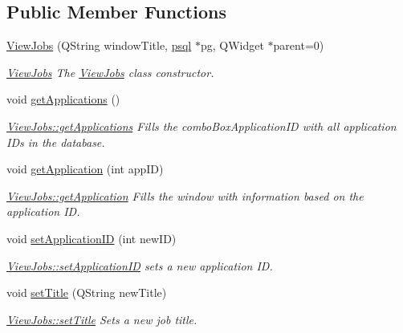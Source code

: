 \subsection*{Public Member Functions}
\begin{DoxyCompactItemize}
\item 
\hyperlink{class_view_jobs_ac78f48cc812a0348a233f33dc78a71cc}{View\+Jobs} (Q\+String window\+Title, \hyperlink{classpsql}{psql} $\ast$pg, Q\+Widget $\ast$parent=0)
\begin{DoxyCompactList}\small\item\em \hyperlink{class_view_jobs}{View\+Jobs} The \hyperlink{class_view_jobs}{View\+Jobs} class constructor. \end{DoxyCompactList}\item 
\mbox{\label{class_view_jobs_af97593f0db01caee0febfe774a823e9c}} 
void \hyperlink{class_view_jobs_af97593f0db01caee0febfe774a823e9c}{get\+Applications} ()
\begin{DoxyCompactList}\small\item\em \hyperlink{class_view_jobs_af97593f0db01caee0febfe774a823e9c}{View\+Jobs\+::get\+Applications} Fills the combo\+Box\+Application\+ID with all application I\+Ds in the database. \end{DoxyCompactList}\item 
void \hyperlink{class_view_jobs_ae9c1c806aa1dd5082b38a1dc9cbec39e}{get\+Application} (int app\+ID)
\begin{DoxyCompactList}\small\item\em \hyperlink{class_view_jobs_ae9c1c806aa1dd5082b38a1dc9cbec39e}{View\+Jobs\+::get\+Application} Fills the window with information based on the application ID. \end{DoxyCompactList}\item 
void \hyperlink{class_view_jobs_acd43a8c32ab9bca7e40ecc99e51da9b8}{set\+Application\+ID} (int new\+ID)
\begin{DoxyCompactList}\small\item\em \hyperlink{class_view_jobs_acd43a8c32ab9bca7e40ecc99e51da9b8}{View\+Jobs\+::set\+Application\+ID} sets a new application ID. \end{DoxyCompactList}\item 
void \hyperlink{class_view_jobs_abfe1969197cde57ea049c1b7d91cd4f5}{set\+Title} (Q\+String new\+Title)
\begin{DoxyCompactList}\small\item\em \hyperlink{class_view_jobs_abfe1969197cde57ea049c1b7d91cd4f5}{View\+Jobs\+::set\+Title} Sets a new job title. \end{DoxyCompactList}\item 

\end{DoxyCompactItemize}
